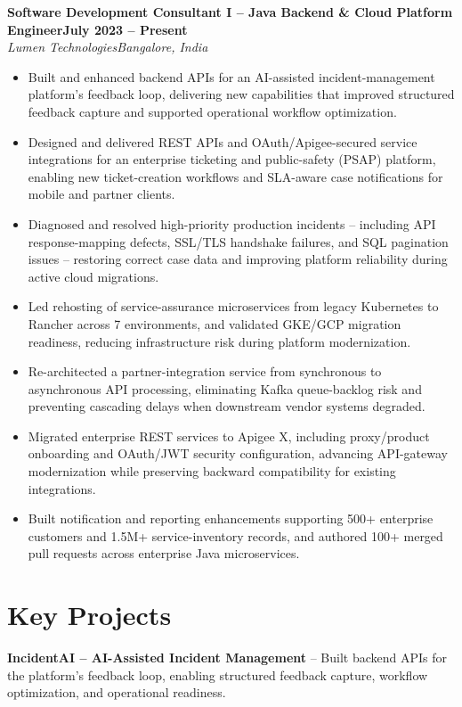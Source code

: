 \documentclass[10pt,a4paper]{article}
\newcommand{\cventry}[4]{%
  \noindent\textbf{#1}\hfill\textbf{#4}\\
  \textit{#2}\hfill\textit{#3}\\[2pt]%
}
\begin{document}
\cventry{Software Development Consultant I -- Java Backend \& Cloud Platform Engineer}{Lumen Technologies}{Bangalore, India}{July 2023 -- Present}
\begin{itemize}
  \item Built and enhanced backend APIs for an AI-assisted incident-management platform's feedback loop, delivering new capabilities that improved structured feedback capture and supported operational workflow optimization.
  \item Designed and delivered REST APIs and OAuth/Apigee-secured service integrations for an enterprise ticketing and public-safety (PSAP) platform, enabling new ticket-creation workflows and SLA-aware case notifications for mobile and partner clients.
  \item Diagnosed and resolved high-priority production incidents -- including API response-mapping defects, SSL/TLS handshake failures, and SQL pagination issues -- restoring correct case data and improving platform reliability during active cloud migrations.
  \item Led rehosting of service-assurance microservices from legacy Kubernetes to Rancher across 7 environments, and validated GKE/GCP migration readiness, reducing infrastructure risk during platform modernization.
  \item Re-architected a partner-integration service from synchronous to asynchronous API processing, eliminating Kafka queue-backlog risk and preventing cascading delays when downstream vendor systems degraded.
  \item Migrated enterprise REST services to Apigee X, including proxy/product onboarding and OAuth/JWT security configuration, advancing API-gateway modernization while preserving backward compatibility for existing integrations.
  \item Built notification and reporting enhancements supporting 500+ enterprise customers and 1.5M+ service-inventory records, and authored 100+ merged pull requests across enterprise Java microservices.
\end{itemize}

\section{Key Projects}

\textbf{IncidentAI -- AI-Assisted Incident Management} -- Built backend APIs for the platform's feedback loop, enabling structured feedback capture, workflow optimization, and operational readiness.
\end{document}
